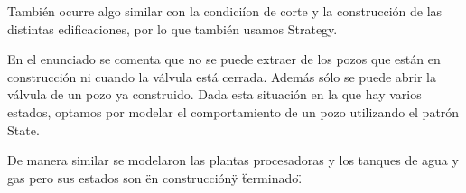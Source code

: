 Tambi\'en ocurre algo similar con la condici\'ion de corte y la construcci\'on de las distintas edificaciones, por lo que tambi\'en usamos Strategy. \\

En el enunciado se comenta que no se puede extraer de los pozos que est\'an en construcci\'on ni cuando la v\'alvula est\'a cerrada. Adem\'as s\'olo se puede abrir la v\'alvula de un pozo ya construido. Dada esta situaci\'on en la que hay varios estados, optamos por modelar el comportamiento de un pozo utilizando el patr\'on State.\\

De manera similar se modelaron las plantas procesadoras y los tanques de agua y gas pero sus estados son \"en construcci\'on\" y \"terminado\".\\



